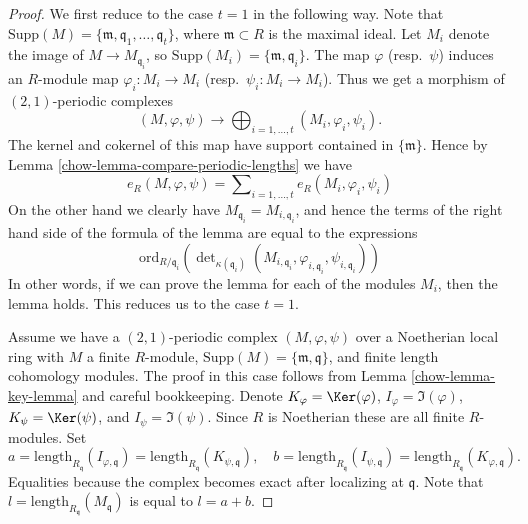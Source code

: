 \begin{proof}

We first reduce to the case $t = 1$ in the following way.
Note that
$\text{Supp}(M) = \{\mathfrak m, \mathfrak q_1, \ldots, \mathfrak q_t\}$,
where $\mathfrak m \subset R$ is the maximal ideal.
Let $M_i$ denote the image of $M \to M_{\mathfrak q_i}$,
so $\text{Supp}(M_i) = \{\mathfrak m, \mathfrak q_i\}$.
The map $\varphi$ (resp.\ $\psi$) induces an $R$-module map
$\varphi_i : M_i \to M_i$ (resp.\ $\psi_i : M_i \to M_i$).
Thus we get a morphism of $(2, 1)$-periodic complexes
$$
(M, \varphi, \psi) \longrightarrow
\bigoplus\nolimits_{i = 1, \ldots, t} (M_i, \varphi_i, \psi_i).
$$
The kernel and cokernel of this map have support contained in
$\{\mathfrak m\}$. Hence by Lemma \ref{chow-lemma-compare-periodic-lengths}
we have
$$
e_R(M, \varphi, \psi) =
\sum\nolimits_{i = 1, \ldots, t}
e_R(M_i, \varphi_i, \psi_i)
$$
On the other hand we clearly have $M_{\mathfrak q_i} = M_{i, \mathfrak q_i}$,
and hence the terms of the right hand side of the formula of the
lemma are equal to the expressions
$$
\text{ord}_{R/\mathfrak q_i}\left(
\det\nolimits_{\kappa(\mathfrak q_i)}
(M_{i, \mathfrak q_i}, \varphi_{i, \mathfrak q_i}, \psi_{i, \mathfrak q_i})
\right)
$$
In other words, if we can prove the lemma for each of the modules
$M_i$, then the lemma holds. This reduces us to the case $t = 1$.

\medskip\noindent
Assume we have a $(2, 1)$-periodic complex $(M, \varphi, \psi)$
over a Noetherian local ring with $M$ a finite $R$-module,
$\text{Supp}(M) = \{\mathfrak m, \mathfrak q\}$, and
finite length cohomology modules. The proof in this case
follows from Lemma \ref{chow-lemma-key-lemma} and careful bookkeeping.
Denote
$K_\varphi = \Ker(\varphi)$,
$I_\varphi = \Im(\varphi)$,
$K_\psi = \Ker(\psi)$, and
$I_\psi = \Im(\psi)$.
Since $R$ is Noetherian these are all finite $R$-modules.
Set
$$
a = \text{length}_{R_{\mathfrak q}}(I_{\varphi, \mathfrak q})
= \text{length}_{R_{\mathfrak q}}(K_{\psi, \mathfrak q}),
\quad
b = \text{length}_{R_{\mathfrak q}}(I_{\psi, \mathfrak q})
= \text{length}_{R_{\mathfrak q}}(K_{\varphi, \mathfrak q}).
$$
Equalities because the complex becomes exact after localizing at
$\mathfrak q$. Note that $l = \text{length}_{R_{\mathfrak q}}(M_{\mathfrak q})$
is equal to $l = a + b$.


\end{proof}
